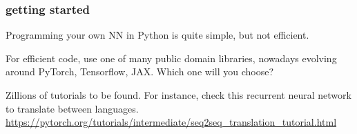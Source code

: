 \documentclass[USenglish,pdftex,compress,10pt,svgnamesi,handout]{beamer}
\begin{document}
\begin{frame}
\frametitle{getting started}

Programming your own NN in Python is quite simple, but not efficient. 

For efficient code, use one of many public domain libraries, nowadays evolving around PyTorch, Tensorflow, JAX.  Which one will you choose?


Zillions of tutorials to be found.  For instance, check this recurrent neural network to translate between languages. \url{https://pytorch.org/tutorials/intermediate/seq2seq_translation_tutorial.html}

\end{frame}
\end{document}
